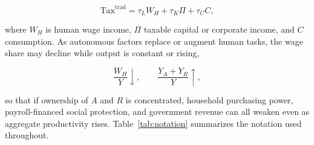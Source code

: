 \documentclass[journal]{IEEEtran}
\theoremstyle{plain}
\theoremstyle{definition}
\begin{document}
\begin{equation}
\label{eq:trad}
\mathrm{Tax}^{\mathrm{trad}} = \tau_L W_H + \tau_K \Pi + \tau_C C,
\end{equation}

where $W_H$ is human wage income, $\Pi$ taxable capital or corporate income, and $C$ consumption. As autonomous factors replace or augment human tasks, the wage share may decline while output is constant or rising,

\begin{equation}
\label{eq:shift}
\frac{W_H}{Y}\downarrow, \qquad \frac{Y_A+Y_R}{Y}\uparrow,
\end{equation}

so that if ownership of $A$ and $R$ is concentrated, household purchasing power, payroll-financed social protection, and government revenue can all weaken even as aggregate productivity rises. Table~\ref{tab:notation} summarizes the notation used throughout.
\end{document}
